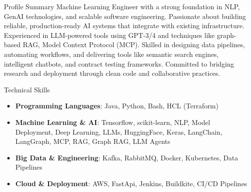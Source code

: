 \documentclass{resume} %
\begin{document}

\begin{rSection}{Profile Summary}
    Machine Learning Engineer with a strong foundation in NLP, GenAI technologies, and scalable software engineering. Passionate about building reliable, production-ready AI systems that integrate with existing infrastructure. Experienced in LLM-powered tools using GPT-3/4 and techniques like graph-based RAG, Model Context Protocol (MCP). Skilled in designing data pipelines, automating workflows, and delivering tools like semantic search engines, intelligent chatbots, and contract testing frameworks. Committed to bridging research and deployment through clean code and collaborative practices.
\end{rSection}

\begin{rSection}{Technical Skills}
    \begin{itemize}
        \item \textbf{Programming Languages}: Java, Python, Bash, HCL (Terraform)
        \item \textbf{Machine Learning \& AI}: Tensorflow, scikit-learn, NLP, Model Deployment, Deep Learning, LLMs, HuggingFace, Keras, LangChain, LangGraph, MCP, RAG, Graph RAG, LLM Agents
        \item \textbf{Big Data \& Engineering}: Kafka, RabbitMQ, Docker, Kubernetes, Data Pipelines
        \item \textbf{Cloud \& Deployment}: AWS, FastApi, Jenkins, Buildkite, CI/CD Pipelines
    \end{itemize}
\end{rSection}
\end{document}
